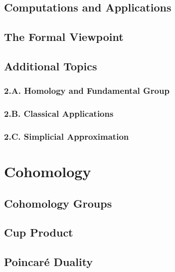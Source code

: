 \documentclass{article}
\begin{document}
\subsection{Computations and Applications}

\subsection{The Formal Viewpoint}

\subsection*{Additional Topics}

\subsubsection*{2.A. Homology and Fundamental Group}

\subsubsection*{2.B. Classical Applications}

\subsubsection*{2.C. Simplicial Approximation}

\newpage

\section{Cohomology}

\subsection{Cohomology Groups}

\subsection{Cup Product}

\subsection{Poincaré Duality}
\end{document}
